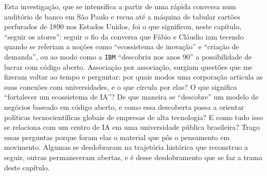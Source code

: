 Esta investigação, que se intensifica a partir de uma rápida conversa num auditório de banco em São Paulo e recua até a máquina de tabular cartões perfurados de 1890 nos Estados Unidos, foi o que significou, neste capítulo, \enquote{seguir os atores}: seguir o fio da conversa que Fábio e Cláudio iam tecendo quando se referiam a noções como \enquote{ecossistema de inovação} e \enquote{criação de demanda}, ou ao modo como a \texttt{IBM} \enquote{descobriu nos anos 90} a possibilidade de lucrar com código aberto. Associação por associação, surgiam questões que me fizeram voltar ao tempo e perguntar: por quais modos uma corporação articula as suas conexões com universidades, e o que circula por elas? O que significa \enquote{fortalecer um ecossistema de IA}? De que maneira se \enquote{descobre} um modelo de negócios baseado em código aberto, e como essa descoberta passa a orientar políticas tecnocientíficas globais de empresas de alta tecnologia? E como tudo isso se relaciona com um centro de IA em uma universidade pública brasileira? Trago essas perguntas porque foram elas o material que pôs o pensamento em movimento. Algumas se desdobraram na trajetória histórica que reconstruo a seguir, outras permaneceram abertas, e é desse desdobramento que se faz a trama deste capítulo.

